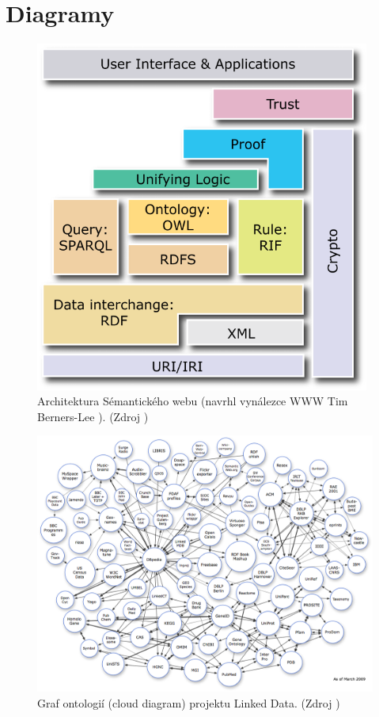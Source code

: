 \chapter{Diagramy}

\begin{figure}[h]
\begin{center}
\includegraphics[width=11cm]{figures/SemWebStack}
\caption{Architektura Sémantického webu (navrhl vynálezce WWW Tim Berners-Lee \cite{semWebStack}). (Zdroj \cite{semWeb})}
\label{diagram:SemWebArch}
\end{center}
\end{figure}

\begin{figure}[h]
\begin{center}
\includegraphics[width=17cm]{figures/linkeddata}
\caption{Graf ontologií (cloud diagram) projektu Linked Data. (Zdroj \cite{linkedData})}
\label{img:linkeddata}
\end{center}
\end{figure}

